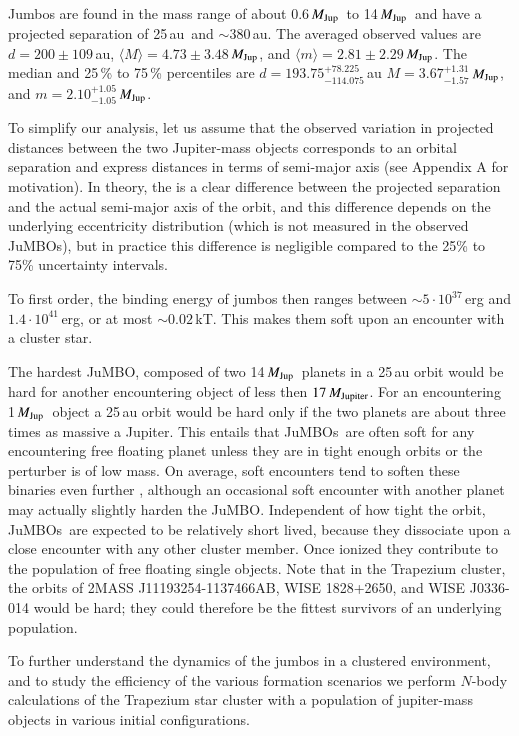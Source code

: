 \documentclass[aa]{lib/aa}
\newcommand{\MJup}{\mbox{${M}_{\rm Jup}$}}
\newcommand{\jumbo}{\mbox{JuMBO}}
\newcommand{\jumbos}{\mbox{JuMBOs}}
\begin{document}
Jumbos are found in the mass range of about 0.6\,\MJup\, to
14\,\MJup\, and have a projected separation of 25\,au\, and $\sim
380$\,au.  The averaged observed values are $d=200\pm109$\,au,
$\langle M\rangle = 4.73\pm3.48$\,\MJup, and $\langle m\rangle =
2.81\pm2.29$\,\MJup. The median and 25\,\% to 75\,\% percentiles are
$d = 193.75^{+78.225}_{-114.075}$\,au $M =
3.67^{+1.31}_{-1.57}$\,\MJup, and $m = 2.10^{+1.05}_{-1.05}$\,\MJup.

To simplify our analysis, let us assume that the observed variation in
projected distances between the two Jupiter-mass objects corresponds
to an orbital separation and express distances in terms of semi-major
axis (see Appendix A for motivation).  In theory, the is a clear
difference between the projected separation and the actual semi-major
axis of the orbit, and this difference depends on the underlying
eccentricity distribution (which is not measured in the observed
\jumbos), but in practice this difference is negligible compared to
the 25\% to 75\% uncertainty intervals.

To first order, the binding energy of jumbos then ranges between $\sim
5\cdot 10^{37}$\,erg and $1.4\cdot 10^{41}$\,erg, or at most $\sim
0.02$\,kT. This makes them soft upon an encounter with a cluster star.

The hardest \jumbo, composed of two 14\,\MJup\, planets in a 25\,au
orbit would be hard for another encountering object of less then
$17\,M_{\rm Jupiter}$.  For an encountering 1\,\MJup\, object a 25\,au
orbit would be hard only if the two planets are about three times as
massive a Jupiter.  This entails that \jumbos\, are often soft for any
encountering free floating planet unless they are in tight enough
orbits or the perturber is of low mass.  On average, soft encounters
tend to soften these binaries even further
\citep{1975MNRAS.173..729H}, although an occasional soft encounter
with another planet may actually slightly harden the \jumbo.
Independent of how tight the orbit, \jumbos\, are expected to be
relatively short lived, because they dissociate upon a close encounter
with any other cluster member.  Once ionized they contribute to the
population of free floating single objects.  Note that in the
Trapezium cluster, the orbits of 2MASS J11193254-1137466AB, WISE
1828+2650, and WISE J0336-014 would be hard; they could therefore be
the fittest survivors of an underlying population.

To further understand the dynamics of the jumbos in a clustered
environment, and to study the efficiency of the various formation
scenarios we perform $N$-body calculations of the Trapezium star
cluster with a population of jupiter-mass objects in various initial
configurations.
\end{document}
